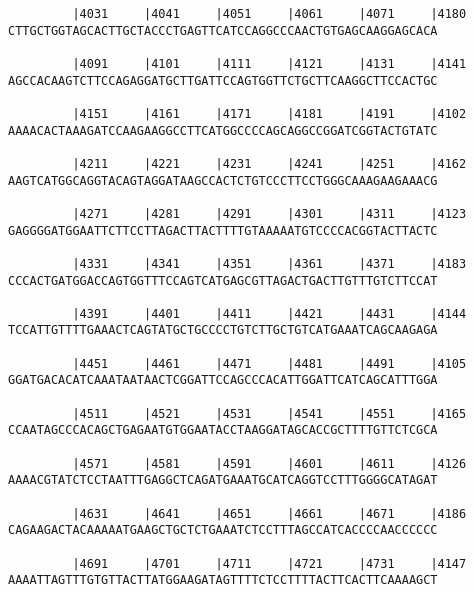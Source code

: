 \documentclass{article}
\begin{document}
\begin{Verbatim}
         |4031     |4041     |4051     |4061     |4071     |4180
CTTGCTGGTAGCACTTGCTACCCTGAGTTCATCCAGGCCCAACTGTGAGCAAGGAGCACA
                                                            
         |4091     |4101     |4111     |4121     |4131     |4141
AGCCACAAGTCTTCCAGAGGATGCTTGATTCCAGTGGTTCTGCTTCAAGGCTTCCACTGC
                                                            
         |4151     |4161     |4171     |4181     |4191     |4102
AAAACACTAAAGATCCAAGAAGGCCTTCATGGCCCCAGCAGGCCGGATCGGTACTGTATC
                                                            
         |4211     |4221     |4231     |4241     |4251     |4162
AAGTCATGGCAGGTACAGTAGGATAAGCCACTCTGTCCCTTCCTGGGCAAAGAAGAAACG
                                                            
         |4271     |4281     |4291     |4301     |4311     |4123
GAGGGGATGGAATTCTTCCTTAGACTTACTTTTGTAAAAATGTCCCCACGGTACTTACTC
                                                            
         |4331     |4341     |4351     |4361     |4371     |4183
CCCACTGATGGACCAGTGGTTTCCAGTCATGAGCGTTAGACTGACTTGTTTGTCTTCCAT
                                                            
         |4391     |4401     |4411     |4421     |4431     |4144
TCCATTGTTTTGAAACTCAGTATGCTGCCCCTGTCTTGCTGTCATGAAATCAGCAAGAGA
                                                            
         |4451     |4461     |4471     |4481     |4491     |4105
GGATGACACATCAAATAATAACTCGGATTCCAGCCCACATTGGATTCATCAGCATTTGGA
                                                            
         |4511     |4521     |4531     |4541     |4551     |4165
CCAATAGCCCACAGCTGAGAATGTGGAATACCTAAGGATAGCACCGCTTTTGTTCTCGCA
                                                            
         |4571     |4581     |4591     |4601     |4611     |4126
AAAACGTATCTCCTAATTTGAGGCTCAGATGAAATGCATCAGGTCCTTTGGGGCATAGAT
                                                            
         |4631     |4641     |4651     |4661     |4671     |4186
CAGAAGACTACAAAAATGAAGCTGCTCTGAAATCTCCTTTAGCCATCACCCCAACCCCCC
                                                            
         |4691     |4701     |4711     |4721     |4731     |4147
AAAATTAGTTTGTGTTACTTATGGAAGATAGTTTTCTCCTTTTACTTCACTTCAAAAGCT
                                                            

\end{Verbatim}
\end{document}
